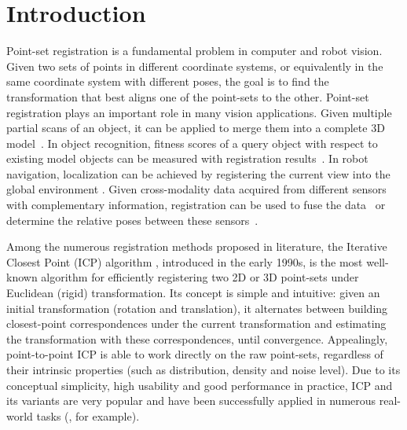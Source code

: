 \documentclass[10pt,journal,cspaper,compsoc]{IEEEtran}
\begin{document}
\maketitle

\IEEEdisplaynotcompsoctitleabstractindextext


\section{Introduction}\label{sec:introduction}
\noindent Point-set registration is a fundamental problem in computer and robot vision. Given two sets of points in different coordinate systems, or equivalently in
the same coordinate system with different poses, the goal is to find the transformation that best aligns one of the point-sets to the other. Point-set registration plays an important role in many vision applications. Given multiple partial scans of an object, it can be applied to merge them into a complete 3D model~\cite{blais1995registering,huber2003fully}. In object recognition, fitness scores of a query object with respect to existing model objects can be measured with registration results~\cite{johnson1999using,belongie2002shape}. In robot navigation, localization can be achieved by registering the current view into the global environment \cite{nuchter20076d,pomerleau2013comparing}. Given cross-modality data acquired from different sensors with complementary information, registration can be used to fuse the data~\cite{makela2002review,zhao2005alignment} or determine the relative poses between these sensors~\cite{yang2013single,geiger2012automatic}.

Among the numerous registration methods proposed in literature, the Iterative Closest Point (ICP) algorithm \cite{besl1992method,yang1991object,zhang1994iterative}, introduced in the early 1990s, is the most well-known algorithm for efficiently registering two 2D or 3D point-sets under Euclidean (rigid) transformation. Its concept is simple and intuitive: given an initial transformation (rotation and translation), it alternates between building closest-point correspondences under the current transformation and estimating the transformation with these correspondences, until convergence. Appealingly, point-to-point ICP is able to work directly on the raw point-sets, regardless of their intrinsic properties (such as distribution, density and noise level). Due to its conceptual simplicity, high usability and good performance in practice, ICP and its variants are very popular and have been successfully applied in numerous real-world tasks (\cite{newcombe2011kinectfusion, seitz2006comparison, makela2002review}, for example).
\end{document}

